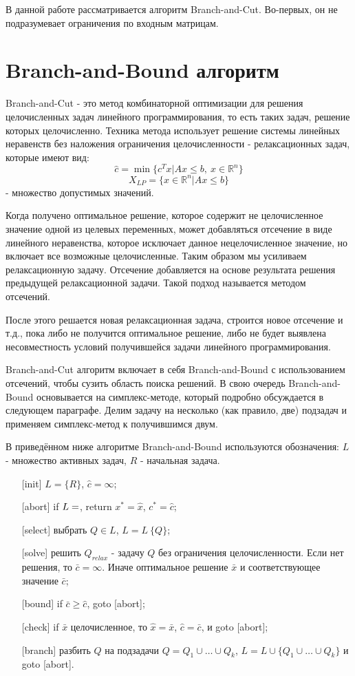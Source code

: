 \documentclass[a4paper,14pt,russian]{extreport}
\begin{document}
В данной работе рассматривается алгоритм Branch-and-Cut. Во-первых, он не подразумевает ограничения по входным матрицам. 


\section{Branch-and-Bound алгоритм}

Branch-and-Cut - это метод комбинаторной оптимизации для решения целочисленных задач линейного программирования, то есть таких задач, решение которых целочисленно. Техника метода использует решение системы линейных неравенств без наложения ограничения целочисленности - релаксационных задач, которые имеют вид: 
  $$\hat c = \min \{c^Tx|Ax\le b,~ x\in\mathbb{R}^n\}$$
  $$X_{LP} = \{x \in \mathbb{R}^n | Ax \le b\}$$ - множество допустимых значений. 
\par Когда получено оптимальное решение, которое содержит не целочисленное значение одной из целевых переменных, может добавляться отсечение в виде линейного неравенства, которое исключает данное нецелочисленное значение, но включает все возможные целочисленные. Таким образом мы усиливаем релаксационную задачу. Отсечение добавляется на основе результата решения предыдущей релаксационной задачи. Такой подход называется методом отсечений. 
\par После этого решается новая релаксационная задача, строится новое отсечение и т.д., пока либо не получится оптимальное решение, либо не будет выявлена несовместность условий получившейся задачи линейного программирования. 
\par Branch-and-Cut алгоритм включает в себя Branch-and-Bound с использованием отсечений, чтобы сузить область поиска решений. В свою очередь Branch-and-Bound основывается на симплекс-методе, который подробно обсуждается в следующем параграфе. Делим задачу на несколько (как правило, две) подзадач и применяем симплекс-метод к получившимся двум.
\par В приведённом ниже алгоритме Branch-and-Bound используются обозначения: $L$ - множество активных задач, $R$ - начальная задача. 
  \begin{enumerate}
  \item[{[init]}] $L = \{R\}$, $\hat c = \infty$;
  \item[{[abort]}] if $L = \empty$, return $x^*=\hat x$, $c^* = \hat c$;
  \item[[{select]}] выбрать $Q\in L$, $L = L \ \{ Q \}$;
  \item[[{solve]}] решить $Q_{relax}$ - задачу $Q$ без ограничения целочисленности. Если нет решения, то $\bar c = \infty$. Иначе оптимальное решение $\bar x$ и соответствующее значение $\bar c$;
  \item[{[bound]}] if $\bar c \ge \hat c$, goto [abort];
  \item[{[check]}] if $\bar x$ целочисленное, то $\hat x = \bar x$, $\hat c = \bar c$, и goto [abort];
  \item[{[branch]}] разбить $Q$ на подзадачи $Q = Q_1 \cup \dots \cup Q_k$, $L = L \cup \{Q_1 \cup \dots \cup Q_k \}$ и goto [abort].
  \end{enumerate}
\end{document}
